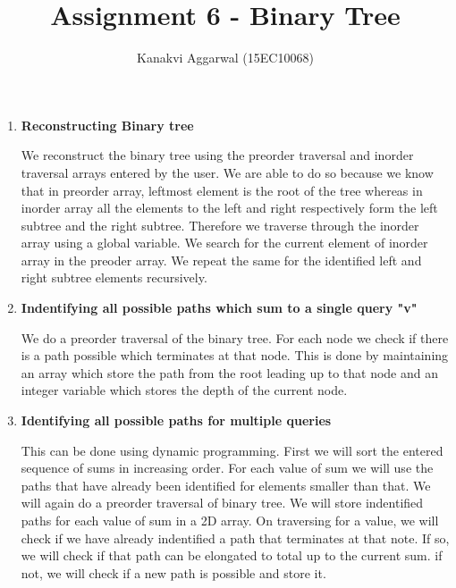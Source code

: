 \documentclass[a4paper,11pt]{article}
\title{Assignment 6 - Binary Tree}
\author{Kanakvi Aggarwal (15EC10068)}
\begin{document}
\maketitle

\begin{enumerate}
 \item \textbf{Reconstructing Binary tree}

We reconstruct the binary tree using the preorder traversal and inorder traversal arrays entered by the user. We are able to do so because we know that in preorder array, leftmost element is the root of the tree whereas in inorder array all the elements to the left and right respectively form the left subtree and the right subtree.
\newline 
Therefore we traverse through the inorder array using a global variable. We search for the current element of inorder array in the preoder array. We repeat the same for the identified left and right subtree elements recursively.  

\item \textbf{Indentifying all possible paths which sum to a single query "v"}

We do a preorder traversal of the binary tree. For each node we check if there is a path possible which terminates at that node. This is done by maintaining an array which store the path from the root leading up to that node and an integer variable which stores the depth of the current node.    

\item \textbf{Identifying all possible paths for multiple queries}

This can be done using dynamic programming. First we will sort the entered sequence of sums in increasing order. For each value of sum we will use the paths that have already been identified for elements smaller than that.
We will again do a preorder traversal of binary tree. We will store indentified paths for each value of sum in a 2D array. On traversing for a value, we will check if we have already indentified a path that terminates at that note. If so, we will check if that path can be elongated to total up to the current sum. if not, we will check if a new path is possible and store it.        
\end{enumerate}
\end{document}
